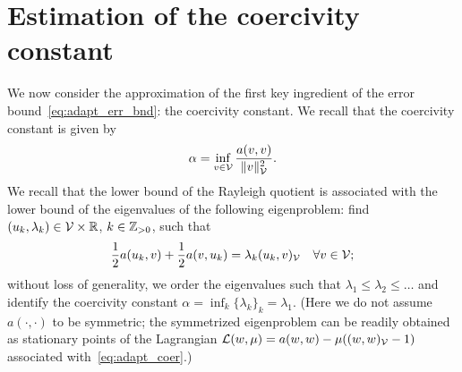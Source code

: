 \section{Estimation of the coercivity constant}
\label{sec:adapt_coer_est}
We now consider the approximation of the first key ingredient of the error bound~\eqref{eq:adapt_err_bnd}: the coercivity constant. We recall that the coercivity constant is given by
\begin{equation}
  \alpha = \inf_{v \in \mathcal{V}} \frac{a(v,v)}{ \| v \|^2_{\mathcal{V}}}.
  \label{eq:adapt_coer}
\end{equation}
We recall that the lower bound of the Rayleigh quotient is associated with the lower bound of the eigenvalues of the following eigenproblem: find $(u_k,\lambda_k) \in \mathcal{V} \times \mathbb{R}$, $k \in \mathbb{Z}_{> 0}$, such that
\begin{equation}
  \frac{1}{2} a(u_k, v) + \frac{1}{2} a(v, u_k)
  = \lambda_k (u_k,v)_{\mathcal{V}} \quad \forall v \in \mathcal{V};
  \label{eq:adapt_coer_eig}
\end{equation}
without loss of generality, we order the eigenvalues such that $\lambda_1 \leq \lambda_2 \leq \dots$ and identify the coercivity constant $\alpha = \inf_k \{ \lambda_k \}_k = \lambda_1$.  (Here we do not assume $a(\cdot,\cdot)$ to be symmetric; the symmetrized eigenproblem can be readily obtained as stationary points of the Lagrangian $\mathcal{L}(w,\mu) = a(w,w) - \mu((w,w)_{\mathcal{V}} - 1)$ associated with~\eqref{eq:adapt_coer}.)

